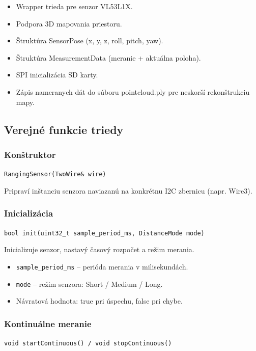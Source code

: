 \begin{itemize}
	\item Wrapper trieda pre senzor VL53L1X.
	\item Podpora 3D mapovania priestoru.
	\item Štruktúra SensorPose (x, y, z, roll, pitch, yaw).
	\item Štruktúra MeasurementData (meranie + aktuálna poloha).
	\item SPI inicializácia SD karty.
	\item Zápis nameranych dát do súboru pointcloud.ply pre neskorší rekonštrukciu mapy.
\end{itemize}

\subsection{Verejné funkcie triedy}

\subsubsection{Konštruktor}

\texttt{RangingSensor(TwoWire\& wire)}

Pripraví inštanciu senzora naviazanú na konkrétnu I2C zbernicu (napr. Wire3).

\subsubsection{Inicializácia}

\texttt{bool init(uint32\_t sample\_period\_ms, DistanceMode mode)}

Inicializuje senzor, nastavý časový rozpočet a režim merania.

\begin{itemize}
	\item \texttt{sample\_period\_ms} -- perióda merania v milisekundách.
	\item \texttt{mode} -- režim senzora: Short / Medium / Long.
	\item Návratová hodnota: true pri úspechu, false pri chybe.
\end{itemize}

\subsubsection{Kontinuálne meranie}

\texttt{void startContinuous() / void stopContinuous()}

